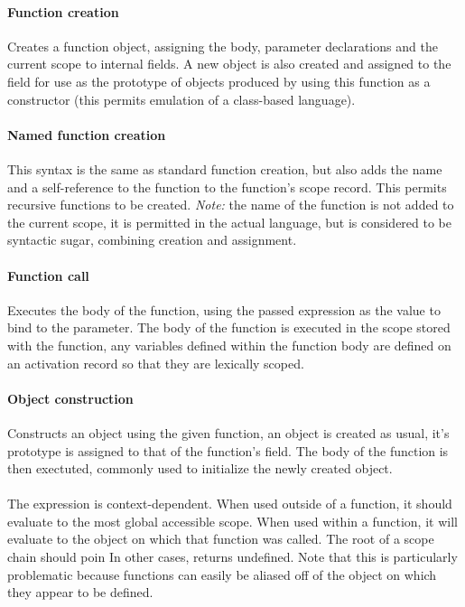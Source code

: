 \documentclass[a4paper]{article}
\begin{document}
\paragraph{Function creation} Creates a function object, assigning the body, parameter
declarations and the current scope to internal fields. A new object is also
created and assigned to the  field for use as the prototype of
objects produced by using this function as a constructor (this permits
emulation of a class-based language).

\paragraph{Named function creation} This syntax is the same as standard function creation,
but also adds the name and a self-reference to the function to the function's
scope record. This permits recursive functions to be created. \emph{Note:} the
name of the function is not added to the current scope, it is permitted in the
actual language, but is considered to be syntactic sugar, combining creation and
assignment.

\paragraph{Function call} Executes the body of the function, using the passed expression
as the value to bind to the parameter. The body of the function is executed in
the scope stored with the function, any variables defined within the function
body are defined on an activation record so that they are lexically scoped. 

\paragraph{Object construction} Constructs an object using the given function, an object
is created as usual, it's prototype is assigned to that of the function's
 field. The body of the function is then exectuted, commonly used
to initialize the newly created object.

\paragraph{} The  expression is context-dependent. When used outside of a
function, it should evaluate to the most global accessible scope.
When used within a function, it will evaluate to the object
on which that function was called. The root of a scope chain should poin In
other cases,  returns undefined. Note that this is particularly
problematic because functions can easily be aliased off of the object on which
they appear to be defined.
\end{document}
